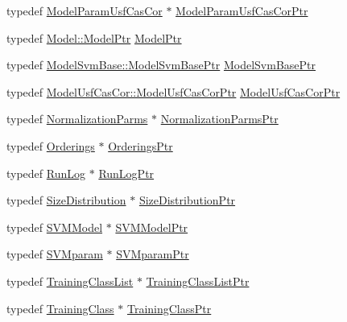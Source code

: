 \begin{DoxyCompactItemize}
\item 
typedef \hyperlink{class_k_k_m_l_l_1_1_model_param_usf_cas_cor}{Model\+Param\+Usf\+Cas\+Cor} $\ast$ \hyperlink{namespace_k_k_m_l_l_aa344d19d8e93c3923eb2c82bc999e9c5}{Model\+Param\+Usf\+Cas\+Cor\+Ptr}
\item 
typedef \hyperlink{class_k_k_m_l_l_1_1_model_a9560fa355dc53fa82541f55582a6d6ea}{Model\+::\+Model\+Ptr} \hyperlink{namespace_k_k_m_l_l_a5e593621576d583bef55408bd6a3cfd5}{Model\+Ptr}
\item 
typedef \hyperlink{class_k_k_m_l_l_1_1_model_svm_base_aa84f0e9baebb7df8a61acf1cf41a4461}{Model\+Svm\+Base\+::\+Model\+Svm\+Base\+Ptr} \hyperlink{namespace_k_k_m_l_l_aabc14867c1482abadc9ad33e5ae16a27}{Model\+Svm\+Base\+Ptr}
\item 
typedef \hyperlink{class_k_k_m_l_l_1_1_model_usf_cas_cor_a42b54852ed4915fd762eb8c0bb5df39b}{Model\+Usf\+Cas\+Cor\+::\+Model\+Usf\+Cas\+Cor\+Ptr} \hyperlink{namespace_k_k_m_l_l_aa418dbdba2899ad356b794adc968e404}{Model\+Usf\+Cas\+Cor\+Ptr}
\item 
typedef \hyperlink{class_k_k_m_l_l_1_1_normalization_parms}{Normalization\+Parms} $\ast$ \hyperlink{namespace_k_k_m_l_l_a398d05517609c333aaf415007f713d79}{Normalization\+Parms\+Ptr}
\item 
typedef \hyperlink{class_k_k_m_l_l_1_1_orderings}{Orderings} $\ast$ \hyperlink{namespace_k_k_m_l_l_a5cf1d479819cbad8a8f6777fd4932015}{Orderings\+Ptr}
\item 
typedef \hyperlink{class_k_k_b_1_1_run_log}{Run\+Log} $\ast$ \hyperlink{namespace_k_k_m_l_l_ab6d9a144ab8fc4ae2bedf27a38454c20}{Run\+Log\+Ptr}
\item 
typedef \hyperlink{class_k_k_m_l_l_1_1_size_distribution}{Size\+Distribution} $\ast$ \hyperlink{namespace_k_k_m_l_l_ae8a07a36e941719925a4af7cea91c08b}{Size\+Distribution\+Ptr}
\item 
typedef \hyperlink{class_k_k_m_l_l_1_1_s_v_m_model}{S\+V\+M\+Model} $\ast$ \hyperlink{namespace_k_k_m_l_l_ab9364c3a3533933d050a3e9a3490e13a}{S\+V\+M\+Model\+Ptr}
\item 
typedef \hyperlink{class_k_k_m_l_l_1_1_s_v_mparam}{S\+V\+Mparam} $\ast$ \hyperlink{namespace_k_k_m_l_l_a54fe1e609c2f04a7f05181a535bf4f92}{S\+V\+Mparam\+Ptr}
\item 
typedef \hyperlink{class_k_k_m_l_l_1_1_training_class_list}{Training\+Class\+List} $\ast$ \hyperlink{namespace_k_k_m_l_l_a21446a7d0151cdc0e5401d0ca6b269bc}{Training\+Class\+List\+Ptr}
\item 
typedef \hyperlink{class_k_k_m_l_l_1_1_training_class}{Training\+Class} $\ast$ \hyperlink{namespace_k_k_m_l_l_aee99044bdeeb0a43cdc845c2c01b1c14}{Training\+Class\+Ptr}

\end{DoxyCompactItemize}
